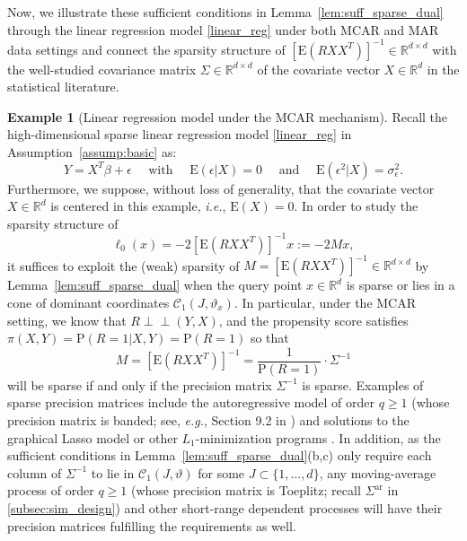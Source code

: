 \documentclass[ejsv2,noshowframe]{imsart}
\theoremstyle{plain}
\theoremstyle{definition}
\newtheorem*{example}{Example}
\theoremstyle{remark}
\newcommand{\ind}{{\perp\!\!\!\perp}}
\begin{document}
Now, we illustrate these sufficient conditions in Lemma~\ref{lem:suff_sparse_dual} through the linear regression model \eqref{linear_reg} under both MCAR and MAR data settings and connect the sparsity structure of $\left[\mathrm{E}(RXX^T) \right]^{-1} \in \mathbb{R}^{d\times d}$ with the well-studied covariance matrix $\Sigma \in \mathbb{R}^{d\times d}$ of the covariate vector $X\in \mathbb{R}^d$ in the statistical literature.

\begin{example}[Linear regression model under the MCAR mechanism]
	\label{example:linear_reg_mcar}
	Recall the high-dimensional sparse linear regression model \eqref{linear_reg} in Assumption~\ref{assump:basic} as:
	$$Y=X^T\beta +\epsilon \quad \text{ with } \quad \mathrm{E}(\epsilon|X)=0 \quad \text{ and }\quad \mathrm{E}\left(\epsilon^2|X\right)=\sigma_{\epsilon}^2.$$	
	Furthermore, we suppose, without loss of generality, that the covariate vector $X \in \mathbb{R}^d$ is centered in this example, \emph{i.e.}, $\mathrm{E}(X)=0$. In order to study the sparsity structure of $$\ell_0(x)=-2\left[\mathrm{E}(RXX^T) \right]^{-1} x :=-2Mx,$$ 
	it suffices to exploit the (weak) sparsity of $M= \left[\mathrm{E}(RXX^T) \right]^{-1} \in \mathbb{R}^{d\times d}$ by Lemma~\ref{lem:suff_sparse_dual} when the query point $x\in \mathbb{R}^d$ is sparse or lies in a cone of dominant coordinates $\mathcal{C}_1\left(J,\vartheta_x \right)$. In particular, under the MCAR setting, we know that $R\ind (Y,X)$, and the propensity score satisfies $\pi(X,Y)=\mathrm{P}(R=1|X,Y) = \mathrm{P}(R=1)$ so that 
	$$M = \left[\mathrm{E}(RXX^T) \right]^{-1}= \frac{1}{\mathrm{P}(R=1)}\cdot \Sigma^{-1}$$ 
	will be sparse if and only if the precision matrix $\Sigma^{-1}$ is sparse. Examples of sparse precision matrices include the autoregressive model of order $q\geq 1$ (whose precision matrix is banded; see, \emph{e.g.}, Section 9.2 in \citealt{lindsey2004statistical}) and solutions to the graphical Lasso model \citep{friedman2008sparse} or other $L_1$-minimization programs \citep{cai2016estimating}. In addition, as the sufficient conditions in Lemma~\ref{lem:suff_sparse_dual}(b,c) only require each column of $\Sigma^{-1}$ to lie in $\mathcal{C}_1(J,\vartheta)$ for some $J\subset \{1,...,d\}$, any moving-average process of order $q\geq 1$ (whose precision matrix is Toeplitz; recall $\Sigma^{\mathrm{ar}}$ in \autoref{subsec:sim_design}) and other short-range dependent processes \citep{rosenblatt2015short} will have their precision matrices fulfilling the requirements as well. 
\end{example}
\end{document}
